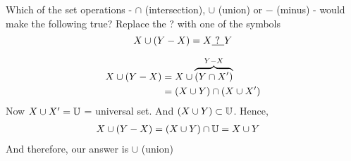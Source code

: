 

\question Which of the set operations - $\cap$ (intersection), $\cup$ (union) or $-$ (minus) - would make 
the following true? Replace the ? with one of the symbols
\[ X\cup(Y-X) = X\underline{\text{   ?   }}Y\]
\watchout

\begin{solution}
  \begin{align}
    X\cup(Y-X) &= X\cup\overbrace{(Y\cap X ')}^{Y-X} \\
           &= (X\cup Y)\cap(X\cup X ') 
  \end{align}
  Now $X\cup X '=\mathbb{U}$ = universal set. And $(X\cup Y)\subset\mathbb{U}$. Hence,
  \begin{align}
    X\cup(Y-X) &= (X\cup Y)\cap\mathbb{U}=X\cup Y
  \end{align}
  And therefore, our answer is $\cup$ (union)
\end{solution}
